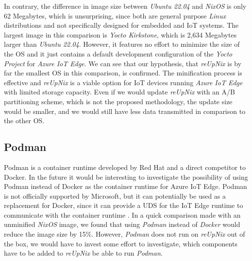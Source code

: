 \noindent
In contrary, the difference in image size between \textit{Ubuntu 22.04} and
\textit{NixOS} is only 62 Megabytes, which is unsurprising, since both are
general purpose \textit{Linux} distributions and not specifically designed
for embedded and \ac{IoT} systems. The largest image in this comparison is
\textit{Yocto Kirkstone}, which is 2,634 Megabytes larger than \textit{Ubuntu 22.04}.
However, it features no effort to minimize the size of the \ac{OS} and it
just contains a default development configuration of the \textit{Yocto Project}
for \textit{Azure IoT Edge}. We can see that our hypothesis, that \textit{reUpNix}
is by far the smallest \ac{OS} in this comparison, is confirmed. The minification
process is effective and \textit{reUpNix} is a viable option for \ac{IoT} devices
running \textit{Azure IoT Edge} with limited storage capacity. Even if we would
update \textit{reUpNix} with an A/B partitioning scheme, which is not the proposed
methodology, the update size would be smaller, and we would still have less data
transmitted in comparison to the other \ac{OS}.

\subsection{Podman}
Podman is a container runtime developed by Red Hat and a direct competitor to Docker.
In the future it would be interesting to investigate the possibility of using
Podman instead of Docker as the container runtime for Azure IoT Edge. Podman is
not officially supported by Microsoft, but it can potentially be used as a
replacement for Docker, since it can provide a \ac{UDS} for the IoT Edge runtime
to communicate with the container runtime \cite{book:3556946,msdoc-supportetplatforms}.
In a quick comparison made with an unminified \textit{NixOS} image, we found that
using \textit{Podman} instead of \textit{Docker} would reduce the image size by
15\%. However, \textit{Podman} does not run on \textit{reUpNix} out of the box,
we would have to invest some effort to investigate, which components have to be
added to \textit{reUpNix} be able to run \textit{Podman}.

